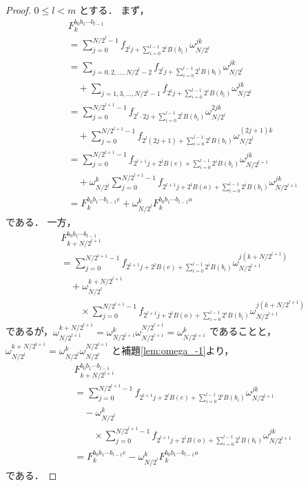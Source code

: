 \documentclass[twocolumn, uplatex, dvipdfmx]{jsarticle}
\renewcommand{\le}{\leqslant}
\numberwithin{equation}{section}
\theoremstyle{definition}
\begin{document}
\begin{proof}
	$0\le l<m$ とする．
	まず，
	\begin{align*}
		&F_k^{b_0b_1\cdots b_{l-1}}\\
		&=\sum_{j=0}^{N/2^l-1}f_{2^lj+\sum_{i=0}^{l-1}2^iB(b_i)}\omega_{N/2^l}^{jk}\\
		&=\sum_{j=0,2,\dots,N/2^l-2}f_{2^lj+\sum_{i=0}^{l-1}2^iB(b_i)}\omega_{N/2^l}^{jk}\\
		&\quad+\sum_{j=1,3,\dots,N/2^l-1}f_{2^lj+\sum_{i=0}^{l-1}2^iB(b_i)}\omega_{N/2^l}^{jk}\\
		&=\sum_{j=0}^{N/2^{l+1}-1}f_{2^l\cdot2j+\sum_{i=0}^{l-1}2^iB(b_i)}\omega_{N/2^l}^{2jk}\\
		&\quad+\sum_{j=0}^{N/2^{l+1}-1}f_{2^l(2j+1)+\sum_{i=0}^{l-1}2^iB(b_i)}\omega_{N/2^l}^{(2j+1)k}\\
		&=\sum_{j=0}^{N/2^{l+1}-1}f_{2^{l+1}j+2^lB(e)+\sum_{i=0}^{l-1}2^iB(b_i)}\omega_{N/2^{l+1}}^{jk}\\
		&\quad+\omega_{N/2^l}^k\sum_{j=0}^{N/2^{l+1}-1}f_{2^{l+1}j+2^lB(o)+\sum_{i=0}^{l-1}2^iB(b_i)}\omega_{N/2^{l+1}}^{jk}\\
		&=F_k^{b_0b_1\cdots b_{l-1}e}+\omega_{N/2^l}^kF_k^{b_0b_1\cdots b_{l-1}o}
	\end{align*}
	である．
	一方，
	\begin{align*}
		&F_{k+N/2^{l+1}}^{b_0b_1\cdots b_{l-1}}\\
		&=\sum_{j=0}^{N/2^{l+1}-1}f_{2^{l+1}j+2^lB(e)+\sum_{i=0}^{l-1}2^iB(b_i)}\omega_{N/2^{l+1}}^{j(k+N/2^{l+1})}\\
		&\quad+\omega_{N/2^l}^{k+N/2^{l+1}}\\
		&\quad\quad\times\sum_{j=0}^{N/2^{l+1}-1}f_{2^{l+1}j+2^lB(o)+\sum_{i=0}^{l-1}2^iB(b_i)}\omega_{N/2^{l+1}}^{j(k+N/2^{l+1})}
	\end{align*}
	であるが，$\omega_{N/2^{l+1}}^{k+N/2^{l+1}}=\omega_{N/2^{l+1}}^k\omega_{N/2^{l+1}}^{N/2^{l+1}}=\omega_{N/2^{l+1}}^k$ であることと，$\omega_{N/2^l}^{k+N/2^{l+1}}=\omega_{N/2^l}^k\omega_{N/2^l}^{N/2^{l+1}}$ と補題\ref{lem:omega_-1}より，
	\begin{align*}
		&F_{k+N/2^{l+1}}^{b_0b_1\cdots b_{l-1}}\\
		&=\sum_{j=0}^{N/2^{l+1}-1}f_{2^{l+1}j+2^lB(e)+\sum_{i=0}^{l-1}2^iB(b_i)}\omega_{N/2^{l+1}}^{jk}\\
		&\quad-\omega_{N/2^l}^k\\
		&\quad\quad\times\sum_{j=0}^{N/2^{l+1}-1}f_{2^{l+1}j+2^lB(o)+\sum_{i=0}^{l-1}2^iB(b_i)}\omega_{N/2^{l+1}}^{jk}\\
		&=F_k^{b_0b_1\cdots b_{l-1}e}-\omega_{N/2^l}^kF_k^{b_0b_1\cdots b_{l-1}o}
	\end{align*}
	である．
\end{proof}
\end{document}
